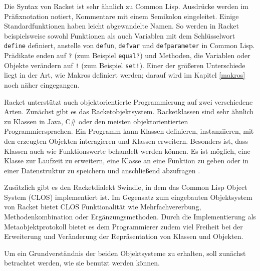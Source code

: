 Die Syntax von Racket ist sehr ähnlich zu Common Lisp. Ausdrücke werden im Präfixnotation notiert, Kommentare mit einem Semikolon eingeleitet. Einige Standardfunktionen haben leicht abgewandelte Namen. So werden in Racket beispielsweise sowohl Funktionen als auch Variablen mit dem Schlüsselwort \texttt{define} definiert, anstelle von \texttt{defun}, \texttt{defvar} und \texttt{defparameter} in Common Lisp. Prädikate enden auf \texttt{?} (zum Beispiel \texttt{equal?}) und Methoden, die Variablen oder Objekte verändern auf \texttt{!} (zum Beispiel \texttt{set!}). Einer der größeren Unterschiede liegt in der Art, wie Makros definiert werden; darauf wird im Kapitel \ref{makros} noch näher eingegangen.

Racket unterstützt auch objektorientierte Programmierung auf zwei verschiedene Arten. Zunächst gibt es das Racketobjektsystem. Racketklassen sind sehr ähnlich zu Klassen in Java, C\# oder den meisten objektorientierten Programmiersprachen. Ein Programm kann Klassen definieren, instanziieren, mit den erzeugten Objekten interagieren und Klassen erweitern. Besonders ist, dass Klassen auch wie Funktionswerte behandelt werden können. Es ist möglich, eine Klasse zur Laufzeit zu erweitern, eine Klasse an eine Funktion zu geben oder in einer Datenstruktur zu speichern und anschließend abzufragen \cite{neu-edu}. 

Zusätzlich gibt es den Racketdialekt Swindle, in dem das Common Lisp Object System (CLOS) implementiert ist. Im Gegensatz zum eingebauten Objektsystem von Racket bietet CLOS Funktionalität wie Mehrfachvererbung, Methodenkombination oder Ergänzungsmethoden. Durch die Implementierung als Metaobjektprotokoll bietet es dem Programmierer zudem viel Freiheit bei der Erweiterung und Veränderung der Repräsentation von Klassen und Objekten.

Um ein Grundverständnis der beiden Objektsysteme zu erhalten, soll zunächst betrachtet werden, wie sie benutzt werden können. %

